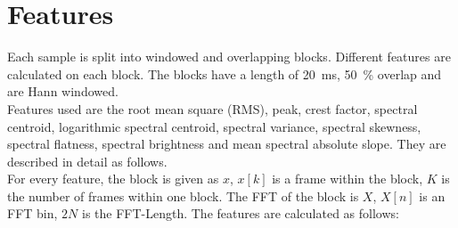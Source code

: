 \section{Features}
\label{sec:Features}
Each sample is split into windowed and overlapping blocks. Different features are calculated on each block. The blocks have a length of 20~ms, 50~\% overlap and are Hann windowed.\\
Features used are the root mean square (RMS), peak, crest factor, spectral centroid, logarithmic spectral centroid, spectral variance, spectral skewness, spectral flatness, spectral brightness and mean spectral absolute slope. They are described in detail as follows.\\
For every feature, the block is given as $x$, $x[k]$ is a frame within the block, $K$ is the number of frames within one block. The FFT of the block is $X$, $X[n]$ is an FFT bin, $2 N$ is the FFT-Length. The features are calculated as follows:
